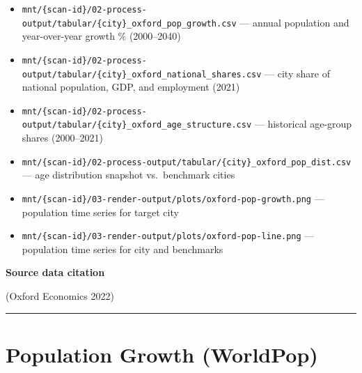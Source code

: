 \documentclass[
  letterpaper,
  DIV=11,
  numbers=noendperiod]{scrreprt}
\providecommand{\tightlist}{%
  \setlength{\itemsep}{0pt}\setlength{\parskip}{0pt}}
\begin{document}
\begin{itemize}
\tightlist
\item
  \texttt{mnt/\{scan-id\}/02-process-output/tabular/\{city\}\_oxford\_pop\_growth.csv}
  --- annual population and year-over-year growth \% (2000--2040)
\item
  \texttt{mnt/\{scan-id\}/02-process-output/tabular/\{city\}\_oxford\_national\_shares.csv}
  --- city share of national population, GDP, and employment (2021)
\item
  \texttt{mnt/\{scan-id\}/02-process-output/tabular/\{city\}\_oxford\_age\_structure.csv}
  --- historical age-group shares (2000--2021)
\item
  \texttt{mnt/\{scan-id\}/02-process-output/tabular/\{city\}\_oxford\_pop\_dist.csv}
  --- age distribution snapshot vs.~benchmark cities
\item
  \texttt{mnt/\{scan-id\}/03-render-output/plots/oxford-pop-growth.png}
  --- population time series for target city
\item
  \texttt{mnt/\{scan-id\}/03-render-output/plots/oxford-pop-line.png}
  --- population time series for city and benchmarks
\end{itemize}

\textbf{Source data citation}

(Oxford Economics 2022)

\begin{center}\rule{0.5\linewidth}{0.5pt}\end{center}

\section{Population Growth (WorldPop)}\label{population-growth-worldpop}
\end{document}
